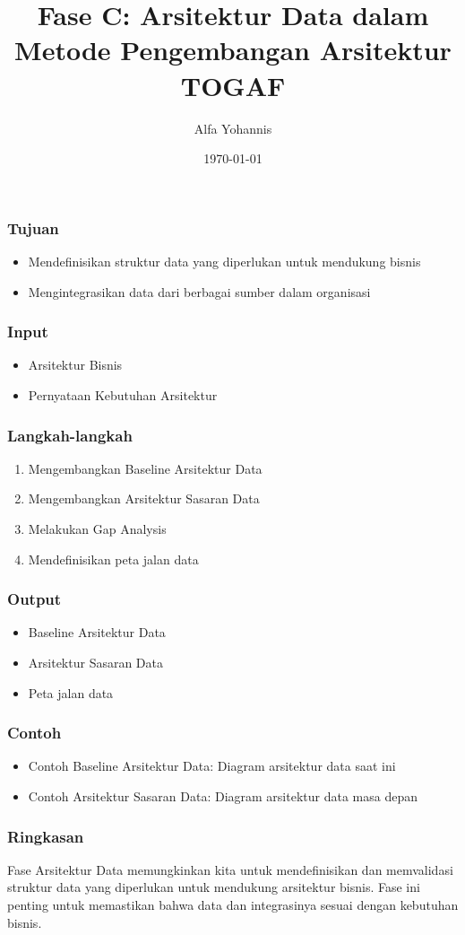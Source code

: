 \documentclass{beamer}
\title{Fase C: Arsitektur Data dalam Metode Pengembangan Arsitektur TOGAF}
\author{Alfa Yohannis}
\date{\today}
\begin{document}
\frame{\titlepage}

\begin{frame}
\frametitle{Tujuan}
\begin{itemize}
\item Mendefinisikan struktur data yang diperlukan untuk mendukung bisnis
\item Mengintegrasikan data dari berbagai sumber dalam organisasi
\end{itemize}
\end{frame}

\begin{frame}
\frametitle{Input}
\begin{itemize}
\item Arsitektur Bisnis
\item Pernyataan Kebutuhan Arsitektur
\end{itemize}
\end{frame}

\begin{frame}
\frametitle{Langkah-langkah}
\begin{enumerate}
\item Mengembangkan Baseline Arsitektur Data
\item Mengembangkan Arsitektur Sasaran Data
\item Melakukan Gap Analysis
\item Mendefinisikan peta jalan data
\end{enumerate}
\end{frame}

\begin{frame}
\frametitle{Output}
\begin{itemize}
\item Baseline Arsitektur Data
\item Arsitektur Sasaran Data
\item Peta jalan data
\end{itemize}
\end{frame}

\begin{frame}
\frametitle{Contoh}
\begin{itemize}
\item Contoh Baseline Arsitektur Data: Diagram arsitektur data saat ini
\item Contoh Arsitektur Sasaran Data: Diagram arsitektur data masa depan
\end{itemize}
\end{frame}

\begin{frame}
\frametitle{Ringkasan}
Fase Arsitektur Data memungkinkan kita untuk mendefinisikan dan memvalidasi struktur data yang diperlukan untuk mendukung arsitektur bisnis. Fase ini penting untuk memastikan bahwa data dan integrasinya sesuai dengan kebutuhan bisnis.
\end{frame}
\end{document}
